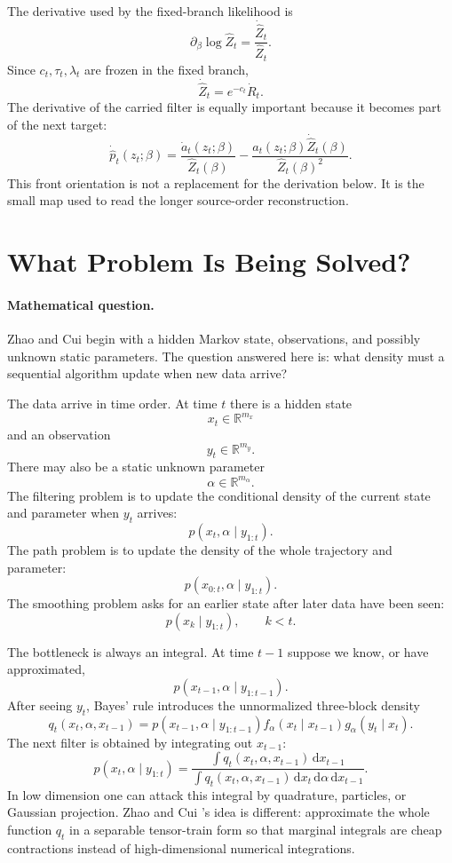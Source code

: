 \documentclass[11pt]{article}
\newcommand{\R}{\mathbb R}
\newcommand{\dd}{\,\mathrm d}
\begin{document}
The derivative used by the fixed-branch likelihood is
\[
    \partial_\beta\log\widehat Z_t
    =
    \frac{\dot{\widehat Z}_t}{\widehat Z_t}.
    \label{eq:p24-p22-o16}
\]
Since \(c_t,\tau_t,\lambda_t\) are frozen in the fixed branch,
\[
    \dot{\widehat Z}_t=e^{-c_t}\dot R_t.
    \label{eq:p24-p22-o17}
\]
The derivative of the carried filter is equally important because it becomes
part of the next target:
\[
    \dot{\widehat p}_t(z_t;\beta)
    =
    \frac{\dot a_t(z_t;\beta)}{\widehat Z_t(\beta)}
    -
    \frac{a_t(z_t;\beta)\dot{\widehat Z}_t(\beta)}
    {\widehat Z_t(\beta)^2}.
    \label{eq:p24-p22-o18}
\]
This front orientation is not a replacement for the derivation below.  It is
the small map used to read the longer source-order reconstruction.

\section{What Problem Is Being Solved?}

\paragraph{Mathematical question.}
Zhao and Cui \cite{zhao2024ttsequential} begin with a hidden Markov state, observations, and possibly unknown
static parameters.  The question answered here is: what density must a
sequential algorithm update when new data arrive?

The data arrive in time order.  At time \(t\) there is a hidden state
\[
    x_t\in \R^{m_x}
\]
and an observation
\[
    y_t\in \R^{m_y}.
\]
There may also be a static unknown parameter
\[
    \alpha\in \R^{m_\alpha}.
\]
The filtering problem is to update the conditional density of the current state
and parameter when \(y_t\) arrives:
\[
    p(x_t,\alpha\mid y_{1:t}).
\]
The path problem is to update the density of the whole trajectory and parameter:
\[
    p(x_{0:t},\alpha\mid y_{1:t}).
\]
The smoothing problem asks for an earlier state after later data have been seen:
\[
    p(x_k\mid y_{1:t}),\qquad k<t.
\]

The bottleneck is always an integral.  At time \(t-1\) suppose we know, or have
approximated,
\[
    p(x_{t-1},\alpha\mid y_{1:t-1}).
\]
After seeing \(y_t\), Bayes' rule introduces the unnormalized three-block
density
\[
    q_t(x_t,\alpha,x_{t-1})
    =
    p(x_{t-1},\alpha\mid y_{1:t-1})
    f_\alpha(x_t\mid x_{t-1})
    g_\alpha(y_t\mid x_t).
\]
The next filter is obtained by integrating out \(x_{t-1}\):
\[
    p(x_t,\alpha\mid y_{1:t})
    =
    \frac{\int q_t(x_t,\alpha,x_{t-1})\dd x_{t-1}}
    {\int q_t(x_t,\alpha,x_{t-1})\dd x_t\dd\alpha\dd x_{t-1}}.
\]
In low dimension one can attack this integral by quadrature, particles, or
Gaussian projection.  Zhao and Cui \cite{zhao2024ttsequential}'s idea is different: approximate the whole
function \(q_t\) in a separable tensor-train form so that marginal integrals are
cheap contractions instead of high-dimensional numerical integrations.
\end{document}
